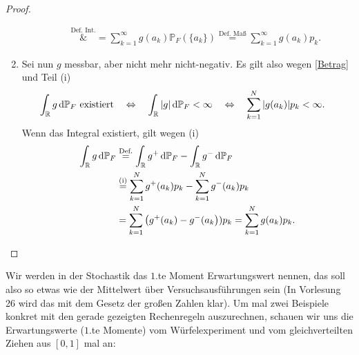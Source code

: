 \begin{proof}
\begin{enumerate}[label=(\roman*)]
\begin{enumerate}[label=(\alph*)]
\begin{align*}
			\overset{\text{Def. Int.}}&{=} \sum_{k = 1}^{\infty} g(a_k) \mathbb{P}_F(\{ a_k \}) \overset{\text{Def. Ma\ss}}{=} \sum_{k = 1}^{\infty} g(a_k)p_k.
			\end{align*}
		\end{enumerate}
		\item Sei nun $g$ messbar, aber nicht mehr nicht-negativ. Es gilt also wegen \eqref{Betrag} und Teil (i)
		\begin{align*}
			\int_{\mathbb{R}} g \, \mathrm{d} \mathbb P_F \text{ existiert} \quad& \Leftrightarrow \quad \int_{\mathbb{R}} |g|\, \mathrm{d} \mathbb{P}_F<\infty\quad
				 \Leftrightarrow\quad \sum_{k=1}^{N} |g(a_k)|p_k < \infty.
		\end{align*}
		Wenn das Integral existiert, gilt wegen (i)
		\begin{align*}
			\int_{\mathbb{R}} g \, \mathrm{d} \mathbb{P}_F &\overset{\text{Def.}}{=} \int_{\mathbb{R}} g^+ \, \mathrm{d} \mathbb{P}_F - \int_{\mathbb{R}} g^- \, \mathrm{d} \mathbb{P}_F \\
			&\overset{\text{(i)}}{=} \sum_{k = 1}^{N}  g^+(a_k) p_k- \sum_{k = 1}^{N}  g^-(a_k)p_k\\
			&= \sum_{k = 1}^{N} \big(g^+(a_k) - g^-(a_k\big))p_k = \sum_{k = 1}^{N}  g(a_k)p_k .
		\end{align*}
	\end{enumerate}
\end{proof}
Wir werden in der Stochastik das $1.$te Moment Erwartungswert nennen, das soll also so etwas wie der Mittelwert \"uber Versuchsausf\"uhrungen sein (In Vorlesung 26 wird das mit dem Gesetz der gro\ss en Zahlen klar). Um mal zwei Beispiele konkret mit den gerade gezeigten Rechenregeln auszurechnen, schauen wir uns die Erwartungswerte ($1.$te Momente) vom W\"urfelexperiment und vom gleichverteilten Ziehen aus $[0,1]$ mal an:
